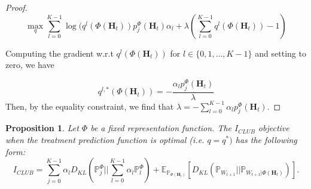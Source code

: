 \documentclass{article}
\theoremstyle{plain}
\newtheorem{proposition}[theorem]{Proposition}
\theoremstyle{definition}
\theoremstyle{remark}
\begin{document}
\begin{proof}
\begin{equation}
    \max_{q} \sum_{l=0}^{K-1} \log(q^{l}(\Phi(\mathbf{H}_t))p_{j}^{\Phi}(\mathbf{H}_t) \alpha_l + \lambda (\sum_{l=0}^{K-1}q^{l}(\Phi(\mathbf{H}_t)) - 1)  
\end{equation}

Computing the gradient w.r.t $q^{l}(\Phi(\mathbf{H}_t))$ for  $l \in \{0,1,\dots, K-1\}$ and setting to zero, we have

\begin{equation}
    q^{l, *}(\Phi(\mathbf{H}_t)) = -\frac{\alpha_l p_{j}^{\Phi}(\mathbf{H}_t)}{\lambda}
\end{equation}
Then, by the equality constraint, we find that $\lambda = -\sum_{l=0}^{K-1}\alpha_l p_{j}^{\Phi}(\mathbf{H}_t)$.
\end{proof}
\begin{proposition}
 \label{prop: iclub_form}
    Let $\Phi$ be a fixed representation function.  The $I_{CLUB}$ objective when the treatment prediction function is optimal (i.e. $ q=q^{*})$ has the following form:  
     \begin{equation}
     \label{eq: i_club_optimal_q}
I_{CLUB} = \sum_{j=0}^{K-1}\alpha_l D_{KL}(\mathbb{P}_j^{\Phi}|| \sum_{l=0}^{K-1}\alpha_l \mathbb{P}_l^{\Phi}) 
+ \mathbb{E}_{\mathbb{P}_{\Phi(\mathbf{H}_t)}}\left[ D_{KL}(\mathbb{P}_{W_{t+1}}||\mathbb{P}_{W_{t+1}|\Phi(\mathbf{H}_t)} )  \right].
     \end{equation}
\end{proposition}
\end{document}
